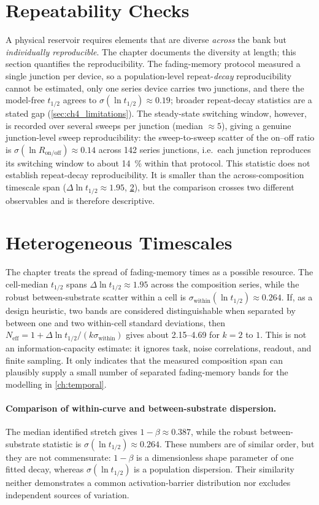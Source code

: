 \section{Repeatability Checks}\label{app:ch4_reproducibility}

A physical reservoir requires elements that are diverse \emph{across} the bank but
\emph{individually reproducible}. The chapter documents the diversity at length;
this section quantifies the reproducibility. The fading-memory protocol measured a
single junction per device, so a population-level repeat-\emph{decay}
reproducibility cannot be estimated, only one series device carries two
junctions, and there the model-free \(t_{1/2}\) agrees to
\(\sigma(\ln t_{1/2})\approx0.19\); broader repeat-decay statistics are a stated
gap (\cref{sec:ch4_limitations}). The steady-state switching window, however, is
recorded over several sweeps per junction (median \(\approx5\)), giving a
genuine junction-level sweep reproducibility: the sweep-to-sweep scatter
of the on--off ratio is \(\sigma(\ln R_{\mathrm{on/off}})\approx0.14\) across
\num{142} series junctions, i.e.\ each junction reproduces its switching window to
about \SI{14}{\percent} within that protocol. This statistic does not establish
repeat-decay reproducibility. It is smaller than the across-composition
timescale span (\(\Delta\ln t_{1/2}\approx1.95\),
\cref{app:ch4_resource}), but the comparison crosses two different observables
and is therefore descriptive.

\section{Heterogeneous Timescales}\label{app:ch4_resource}

The chapter treats the spread of fading-memory times as a possible resource. The
cell-median \(t_{1/2}\) spans \(\Delta\ln t_{1/2}\approx1.95\) across the
composition series, while the robust between-substrate scatter within a cell is
\(\sigma_{\mathrm{within}}(\ln t_{1/2})\approx0.264\). If, as a design heuristic,
two bands are considered distinguishable when separated by between one and two
within-cell standard deviations, then
\(N_{\mathrm{eff}}=1+\Delta\ln t_{1/2}/(k\sigma_{\mathrm{within}})\) gives about
\numrange{2.15}{4.69} for \(k=2\) to \(1\). This is not an information-capacity
estimate: it ignores task, noise correlations, readout, and finite sampling. It
only indicates that the measured composition span can plausibly supply a small
number of separated fading-memory bands for the modelling in \cref{ch:temporal}.

\paragraph{Comparison of within-curve and between-substrate dispersion.} The
median identified stretch gives \(1-\beta\approx0.387\), while the robust
between-substrate statistic is \(\sigma(\ln t_{1/2})\approx0.264\). These numbers
are of similar order, but they are not commensurate: \(1-\beta\) is a
dimensionless shape parameter of one fitted decay, whereas
\(\sigma(\ln t_{1/2})\) is a population dispersion. Their similarity neither
demonstrates a common activation-barrier distribution nor excludes independent
sources of variation.
